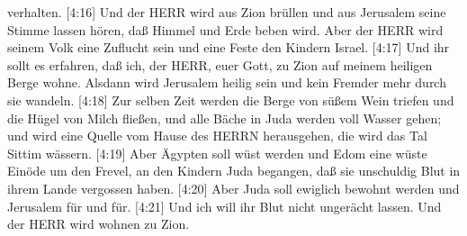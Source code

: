 verhalten.  {[}4:16{]} Und der HERR wird aus Zion brüllen
und aus Jerusalem seine Stimme lassen hören, daß Himmel und Erde beben
wird. Aber der HERR wird seinem Volk eine Zuflucht sein und eine Feste
den Kindern Israel.  {[}4:17{]} Und ihr sollt es erfahren,
daß ich, der HERR, euer Gott, zu Zion auf meinem heiligen Berge wohne.
Alsdann wird Jerusalem heilig sein und kein Fremder mehr durch sie
wandeln.  {[}4:18{]} Zur selben Zeit werden die Berge von
süßem Wein triefen und die Hügel von Milch fließen, und alle Bäche in
Juda werden voll Wasser gehen; und wird eine Quelle vom Hause des HERRN
herausgehen, die wird das Tal Sittim wässern.  {[}4:19{]}
Aber Ägypten soll wüst werden und Edom eine wüste Einöde um den Frevel,
an den Kindern Juda begangen, daß sie unschuldig Blut in ihrem Lande
vergossen haben.  {[}4:20{]} Aber Juda soll ewiglich
bewohnt werden und Jerusalem für und für.  {[}4:21{]} Und
ich will ihr Blut nicht ungerächt lassen. Und der HERR wird wohnen zu
Zion.
